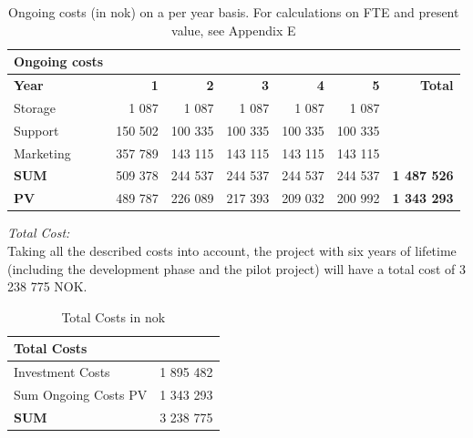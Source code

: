 \begin{table}
\centering
    \begin{tabular}{|l|r|r|r|r|r|r|}
        \hline
       \textbf{Ongoing costs}  & & & & & & \\ \hline
      \textbf{Year} & \textbf{1} & \textbf{2} & \textbf{3} & \textbf{4} & \textbf{5} & \textbf{Total}\\ \hline
	   Storage & 1 087 & 1 087 & 1 087 & 1 087 & 1 087 &\\ \hline
	  Support & 150 502 & 100 335 & 100 335 & 100 335 & 100 335 & \\ \hline
	  Marketing & 357 789 & 143 115 & 143 115 & 143 115 & 143 115 & \\ \hline
	   \textbf{SUM} & 509 378 & 244 537 & 244 537 & 244 537 & 244 537 & \textbf{1 487 526} \\ \hline  
	   \textbf{PV} & 489 787 & 226 089 & 217 393 & 209 032 & 200 992 & \textbf{1 343 293}  \\ \hline
    \end{tabular}
    \caption[Ongoing costs on a per year basis]{Ongoing costs (in \ac{nok}) on a per year basis. For calculations on FTE and present value, see Appendix E}
    \label{tab:ongoing}
\end{table}
\emph{Total Cost:}\\
Taking all the described costs into account, the project with six years of lifetime (including the development phase and the pilot project) will have a total cost of 3 238 775 NOK.

\begin{table}[h]
\centering
\begin{tabular}{|l|r|}
\hline
\textbf{Total Costs} & \\ \hline
Investment Costs & 1 895 482 \\ \hline
Sum Ongoing Costs PV & 1 343 293 \\ \hline
\textbf{SUM} & 3 238 775 \\ \hline
\end{tabular}
\caption[Total Costs]{Total Costs in \ac{nok}}
\label{tab:totalcosts}
\end{table}

